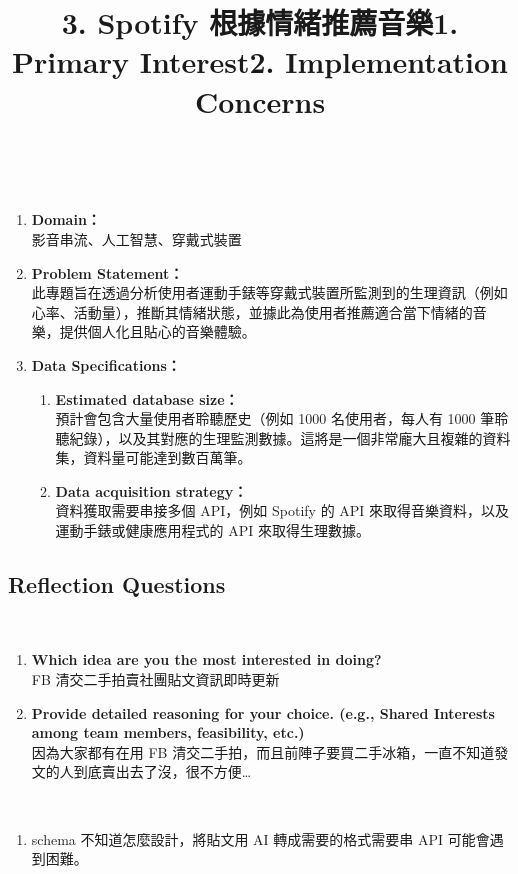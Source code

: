 \ \\
\title{\bf{3. Spotify 根據情緒推薦音樂}}
\begin{enumerate}
    \item {\bf{Domain：}} \\影音串流、人工智慧、穿戴式裝置
    \item {\bf{Problem Statement：}} \\此專題旨在透過分析使用者運動手錶等穿戴式裝置所監測到的生理資訊（例如心率、活動量），推斷其情緒狀態，並據此為使用者推薦適合當下情緒的音樂，提供個人化且貼心的音樂體驗。
    \item {\bf{Data Specifications：}}
        \begin{enumerate}
            \item {\bf{Estimated database size：}} \\預計會包含大量使用者聆聽歷史（例如 1000 名使用者，每人有 1000 筆聆聽紀錄），以及其對應的生理監測數據。這將是一個非常龐大且複雜的資料集，資料量可能達到數百萬筆。
            \item {\bf{Data acquisition strategy：}} \\資料獲取需要串接多個 API，例如 Spotify 的 API 來取得音樂資料，以及運動手錶或健康應用程式的 API 來取得生理數據。
        \end{enumerate}
\end{enumerate}

\subsection{Reflection Questions}
\ \\
\title{\bf{1. Primary Interest}} 
\begin{enumerate}
    \item {\bf{Which idea are you the most interested in doing?}} \\FB 清交二手拍賣社團貼文資訊即時更新
    \item {\bf{Provide detailed reasoning for your choice. (e.g., Shared Interests among team members, feasibility, etc.)}} \\因為大家都有在用 FB 清交二手拍，而且前陣子要買二手冰箱，一直不知道發文的人到底賣出去了沒，很不方便…
\end{enumerate}
\ \\
\title{\bf{2. Implementation Concerns}}
\begin{enumerate}
    \item schema 不知道怎麼設計，將貼文用 AI 轉成需要的格式需要串 API 可能會遇到困難。
\end{enumerate}